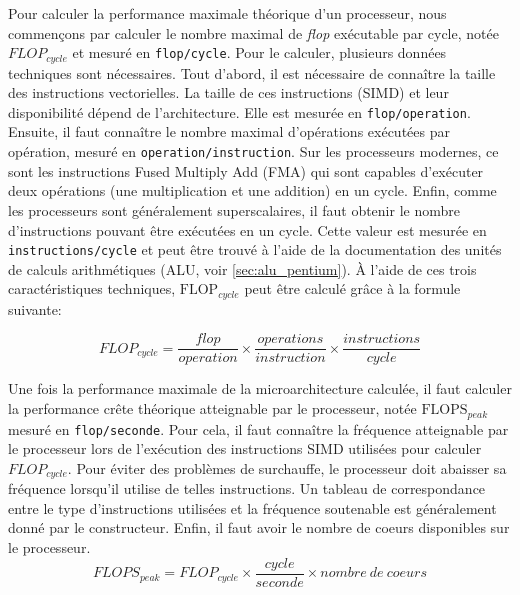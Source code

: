         Pour calculer la performance maximale théorique d'un processeur, nous commençons par calculer le nombre maximal de \textit{flop} exécutable par cycle, notée $FLOP_{cycle}$ et mesuré en \verb=flop/cycle=. Pour le calculer, plusieurs données techniques sont nécessaires. 
        Tout d'abord, il est nécessaire de connaître la taille des instructions vectorielles. La taille de ces instructions (SIMD) et leur disponibilité dépend de l'architecture. Elle est mesurée en \verb=flop/operation=.
        Ensuite, il faut connaître le nombre maximal d'opérations exécutées par opération, mesuré en \verb=operation/instruction=. Sur les processeurs modernes, ce sont les instructions Fused Multiply Add (\gls{FMA}) qui sont capables d'exécuter deux opérations (une multiplication et une addition) en un cycle.
        Enfin, comme les processeurs sont généralement superscalaires, il faut obtenir le nombre d'instructions pouvant être exécutées en un cycle. Cette valeur est mesurée en \verb=instructions/cycle= et peut être trouvé à l'aide de la documentation des unités de calculs arithmétiques (ALU, voir \autoref{sec:alu_pentium}).
        À l'aide de ces trois caractéristiques techniques, $\text{FLOP}_{cycle}$ peut être calculé grâce à la formule suivante:
        
        \begin{equation}
        \label{eq:floc}
            FLOP_{cycle} = \frac{flop}{operation} \times \frac{operations}{instruction} \times \frac{instructions}{cycle}
        \end{equation}
        
        Une fois la performance maximale de la microarchitecture calculée, il faut calculer la performance crête théorique atteignable par le processeur, notée $\text{FLOPS}_{peak}$ mesuré en \verb=flop/seconde=. Pour cela, il faut connaître la fréquence atteignable par le processeur lors de l'exécution des instructions SIMD utilisées pour calculer $FLOP_{cycle}$. Pour éviter des problèmes de surchauffe, le processeur doit abaisser sa fréquence lorsqu'il utilise de telles instructions. Un tableau de correspondance entre le type d'instructions utilisées et la fréquence soutenable est généralement donné par le constructeur. Enfin, il faut avoir le nombre de coeurs disponibles sur le processeur.
        \begin{equation}
        \label{eq:flops}
            FLOPS_{peak} = FLOP_{cycle} \times \frac{cycle}{seconde} \times nombre\ de\ coeurs
        \end{equation}
    
